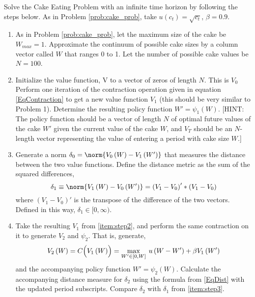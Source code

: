 \begin{problem}
Solve the Cake Eating Problem with an infinite time horizon by following the steps below.  As in Problem \ref{prob:cake_prob}, take $u(c_t) = \sqrt{c_t}$, $\beta = 0.9$.
\begin{enumerate}
\item As in Problem \ref{prob:cake_prob}, let the maximum size of the cake be $W_{max} = 1$. Approximate the continuum of possible cake sizes by a column vector called $W$ that ranges 0 to 1.  Let the number of possible cake values be $N=100$.

\item \label{item:step2} Initialize the value function, V to a vector of zeros of length $N$.  This is $V_0$  Perform one iteration of the contraction operation given in equation \eqref{EqContraction} to get a new value function $V_1$ (this should be very similar to Problem 1).  Determine the resulting policy function $W' = \psi_1\left(W\right)$.  [HINT: The policy function should be a vector of length $N$ of optimal future values of the cake $W'$ given the current value of the cake $W$, and $V_T$ should be an $N$-length vector representing the value of entering a period with cake size $W$.]

\item \label{item:step3} Generate a norm $\delta_0 = \norm{V_0\left(W\right) - V_1\left(W'\right)}$ that measures the distance between the two value functions. Define the distance metric as the sum of the squared differences,
\begin{equation}
\label{EqDist}
\delta_1\equiv \norm{V_1\left(W\right) - V_0\left(W'\right)} = \left(V_1 - V_0\right)'*\left(V_1 - V_0\right)
\end{equation}
where $\left(V_1-V_0\right)'$ is the transpose of the difference of the two vectors. Defined in this way, $\delta_1\in [0,\infty)$.

\item \label{item:step4} Take the resulting $V_1$ from \ref{item:step2}, and perform the same contraction on it to generate $V_2$ and $\psi_2$. That is, generate,
\begin{equation*}
  V_2\left(W\right) = C\Bigl(V_1\left(W\right)\Bigr) = \max_{W'\in[0,W]}\: u\left(W - W'\right) + \beta V_1\left(W'\right)
\end{equation*}
and the accompanying policy function $W'=\psi_2\left(W\right)$. Calculate the accompanying distance measure for $\delta_2$ using the formula from \eqref{EqDist} with the updated period subscripts. Compare $\delta_2$ with $\delta_1$ from \ref{item:step3}.


\end{enumerate}
\end{problem}
